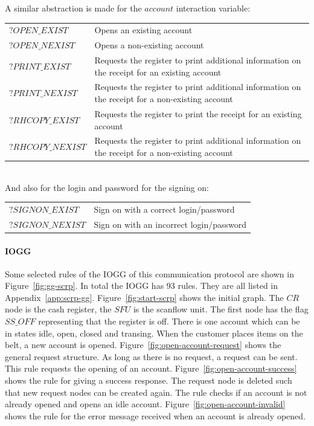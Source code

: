 A similar abstraction is made for the $\mathit{account}$ interaction variable: 
\vspace{5px}\\
\begin{tabular}{lp{310px}}
$\mathit{?OPEN\_EXIST}$ & Opens an existing account \\
$\mathit{?OPEN\_NEXIST}$ & Opens a non-existing account \\
$\mathit{?PRINT\_EXIST}$ & Requests the register to print additional information on the receipt for an existing account \\
$\mathit{?PRINT\_NEXIST}$ & Requests the register to print additional information on the receipt for a non-existing account \\
$\mathit{?RHCOPY\_EXIST}$ & Requests the register to print the receipt for an existing account \\
$\mathit{?RHCOPY\_NEXIST}$ & Requests the register to print additional information on the receipt for a non-existing account \\
\end{tabular}
\vspace{5px} \\
And also for the login and password for the signing on: 
\vspace{5px}\\
\begin{tabular}{ll}
$\mathit{?SIGNON\_EXIST}$ & Sign on with a correct login/password \\
$\mathit{?SIGNON\_NEXIST}$ & Sign on with an incorrect login/password \\
\end{tabular}

\paragraph*{IOGG} Some selected rules of the IOGG of this communication protocol are shown in Figure~\ref{fig:gg-scrp}. In total the IOGG has 93 rules. They are all listed in Appendix~\ref{app:scrp-gg}. Figure~\ref{fig:start-scrp} shows the initial graph. The $CR$ node is the cash register, the $SFU$ is the scanflow unit. The first node has the flag $\mathit{SS\_OFF}$ representing that the register is off. There is one account which can be in states idle, open, closed and transing. When the customer places items on the belt, a new account is opened. Figure~\ref{fig:open-account-request} shows the general request structure. As long as there is no request, a request can be sent. This rule requests the opening of an account. Figure~\ref{fig:open-account-success} shows the rule for giving a success response. The request node is deleted such that new request nodes can be created again. The rule checks if an account is not already opened and opens an idle account. Figure~\ref{fig:open-account-invalid} shows the rule for the error message received when an account is already opened. 

